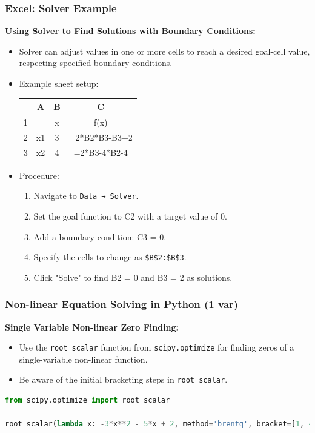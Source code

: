 \begin{frame}[fragile]
    \frametitle{Excel: Solver Example}

    \textbf{Using Solver to Find Solutions with Boundary Conditions:}
    \begin{itemize}
        \item Solver can adjust values in one or more cells to reach a desired goal-cell value, respecting specified boundary conditions.
        \item Example sheet setup:

            \begin{tabular}{|c|c|c|c|}
                \hline
                  & A & B & C \\
                \hline
                1 & & x & f(x) \\
                \hline
                2 & x1 & 3 & =2*B2*B3-B3+2 \\
                \hline
                3 & x2 & 4 & =2*B3-4*B2-4 \\
                \hline
            \end{tabular}
      
        \item Procedure:
        \begin{enumerate}
            \item Navigate to \texttt{Data → Solver}.
            \item Set the goal function to C2 with a target value of 0.
            \item Add a boundary condition: C3 = 0.
            \item Specify the cells to change as \texttt{\$B\$2:\$B\$3}.
            \item Click "Solve" to find B2 = 0 and B3 = 2 as solutions.
        \end{enumerate}
    \end{itemize}
\end{frame}

\begin{frame}[fragile]
  \frametitle{Non-linear Equation Solving in Python (1 var)}

  \textbf{Single Variable Non-linear Zero Finding:}
  \begin{itemize}
      \item Use the \texttt{root\_scalar} function from \texttt{scipy.optimize} for finding zeros of a single-variable non-linear function.
      \item Be aware of the initial bracketing steps in \texttt{root\_scalar}.
  \end{itemize}

  \begin{lstlisting}[language=Python]
from scipy.optimize import root_scalar

root_scalar(lambda x: -3*x**2 - 5*x + 2, method='brentq', bracket=[1, 4], xtol=1e-15)
  \end{lstlisting}
  
\end{frame}


